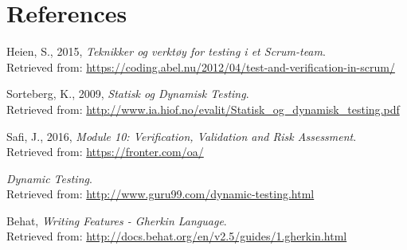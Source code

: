 \section{References}
\begin{thebibliography}{10}

    
    Heien, S., 2015, \textit{Teknikker og verktøy for testing i et Scrum-team}. \\
    \qquad Retrieved from: \url{https://coding.abel.nu/2012/04/test-and-verification-in-scrum/}
    
    Sorteberg, K., 2009, \textit{Statisk og Dynamisk Testing}. \\
    \qquad Retrieved from: \url{http://www.ia.hiof.no/evalit/Statisk_og_dynamisk_testing.pdf}
    
    
    Safi, J., 2016, \textit{Module 10: Verification, Validation and Risk Assessment}. \\
    \qquad Retrieved from: \url{https://fronter.com/oa/}
    
    \textit{Dynamic Testing}. \\
    \qquad Retrieved from: \url{http://www.guru99.com/dynamic-testing.html}
    
    Behat, \textit{Writing Features - Gherkin Language}. \\
    \qquad Retrieved from: \url{http://docs.behat.org/en/v2.5/guides/1.gherkin.html}

    
\end{thebibliography}
    
    
    



